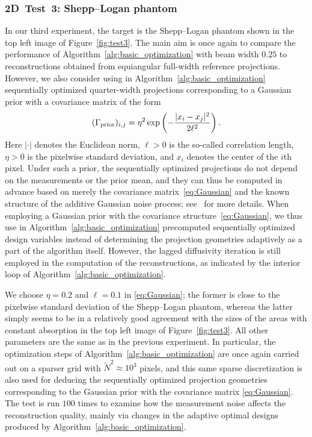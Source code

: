 \documentclass[final]{siamltex}
\begin{document}
\subsubsection{2D~Test~3: Shepp--Logan phantom}
In our third experiment, the target is the Shepp--Logan phantom shown in the top left image of Figure~\ref{fig:test3}. The main aim is once again to compare the performance of Algorithm~\ref{alg:basic_optimization} with beam width $0.25$ to reconstructions obtained from equiangular full-width reference projections. However, we also consider using in Algorithm~\ref{alg:basic_optimization} sequentially optimized quarter-width projections corresponding to a Gaussian prior with a covariance matrix of the form
\begin{equation}
  \label{eq:Gaussian}
 (\Gamma_{\rm prior})_{i,j} = \eta^2 \exp \left(-\frac{| x_i - x_j |^2}{2\ell^2} \right).
 \end{equation}
Here $| \cdot |$ denotes the Euclidean norm, $\ell>0$ is the so-called correlation length, $\eta>0$ is the pixelwise standard deviation, and $x_i$ denotes the center of the $i$th pixel. Under such a prior, the sequentially optimized projections do not depend on the measurements or the prior mean, and they can thus be computed in advance based on merely the covariance matrix~\eqref{eq:Gaussian} and the known structure of the additive Gaussian noise process; see~\cite{Burger21} for more details. When employing a Gaussian prior with the covariance structure~\eqref{eq:Gaussian}, we thus use in Algorithm~\ref{alg:basic_optimization} precomputed sequentially optimized design variables instead of determining the projection geometries adaptively as a part of the algorithm itself. However, the lagged diffusivity iteration is still employed in the computation of the reconstructions, as indicated by the interior loop of Algorithm~\ref{alg:basic_optimization}.

We choose $\eta = 0.2$ and $\ell=0.1$ in \eqref{eq:Gaussian}; the former is close to the pixelwise standard deviation of the Shepp--Logan phantom, whereas the latter simply seems to be in a relatively good agreement with the sizes of the areas with constant absorption in the top left image of Figure~\ref{fig:test3}. All other parameters are the same as in the previous experiment. In particular, the optimization steps of Algorithm~\ref{alg:basic_optimization} are once again carried out on a sparser grid with $\tilde{N}^2 \approx 10^3$ pixels, and this same sparse discretization is also used for deducing the sequentially optimized projection geometries corresponding to the Gaussian prior with the covariance matrix \eqref{eq:Gaussian}. The test is run $100$ times to examine how the measurement noise affects the reconstruction quality, mainly via changes in the adaptive optimal designs produced by Algorithm~\ref{alg:basic_optimization}.
\end{document}
